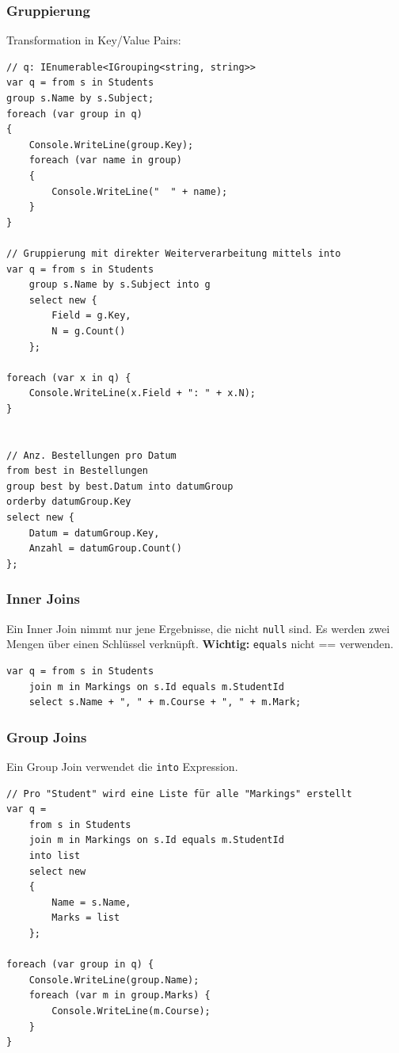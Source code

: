 \documentclass[
a4paper,
oneside,
10pt,
fleqn,
headsepline,
toc=listofnumbered, 
bibliography=totocnumbered]{scrartcl}
\begin{document}
\subsubsection{Gruppierung}
Transformation in Key/Value Pairs:
\begin{lstlisting}
// q: IEnumerable<IGrouping<string, string>>
var q = from s in Students
group s.Name by s.Subject;
foreach (var group in q)
{
	Console.WriteLine(group.Key);
	foreach (var name in group)
	{
		Console.WriteLine("  " + name);
	}
}

// Gruppierung mit direkter Weiterverarbeitung mittels into
var q = from s in Students
	group s.Name by s.Subject into g
	select new {
		Field = g.Key,
		N = g.Count()
	};

foreach (var x in q) {
	Console.WriteLine(x.Field + ": " + x.N);
}


// Anz. Bestellungen pro Datum
from best in Bestellungen
group best by best.Datum into datumGroup
orderby datumGroup.Key
select new {
	Datum = datumGroup.Key,
	Anzahl = datumGroup.Count()
};

\end{lstlisting}

\clearpage

\subsubsection{Inner Joins}
Ein Inner Join nimmt nur jene Ergebnisse, die nicht \lstinline|null| sind.
Es werden zwei Mengen über einen Schlüssel verknüpft.
\textbf{Wichtig: } \lstinline|equals| nicht == verwenden.
\begin{lstlisting}
var q = from s in Students
	join m in Markings on s.Id equals m.StudentId
	select s.Name + ", " + m.Course + ", " + m.Mark;
\end{lstlisting}

\subsubsection{Group Joins}
Ein Group Join verwendet die \lstinline|into| Expression.
\begin{lstlisting}
// Pro "Student" wird eine Liste für alle "Markings" erstellt 
var q =
	from s in Students
	join m in Markings on s.Id equals m.StudentId
	into list
	select new
	{
		Name = s.Name,
		Marks = list
	};
	
foreach (var group in q) {
	Console.WriteLine(group.Name);
	foreach (var m in group.Marks) {
		Console.WriteLine(m.Course);
	}
}
\end{lstlisting}
\end{document}
